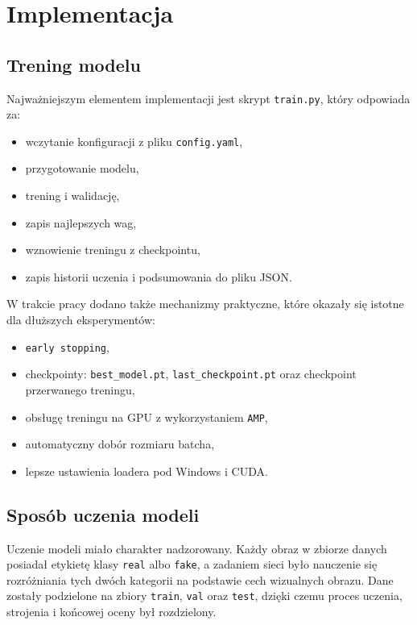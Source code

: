 \newpage
\section{Implementacja}

\subsection{Trening modelu}

Najważniejszym elementem implementacji jest skrypt \texttt{train.py}, który odpowiada za:

\begin{itemize}
    \item wczytanie konfiguracji z pliku \texttt{config.yaml},
    \item przygotowanie modelu,
    \item trening i walidację,
    \item zapis najlepszych wag,
    \item wznowienie treningu z checkpointu,
    \item zapis historii uczenia i podsumowania do pliku JSON.
\end{itemize}

W trakcie pracy dodano także mechanizmy praktyczne, które okazały się istotne dla dłuższych eksperymentów:

\begin{itemize}
    \item \texttt{early stopping},
    \item checkpointy: \texttt{best\_model.pt}, \texttt{last\_checkpoint.pt} oraz checkpoint przerwanego treningu,
    \item obsługę treningu na GPU z wykorzystaniem \texttt{AMP},
    \item automatyczny dobór rozmiaru batcha,
    \item lepsze ustawienia loadera pod Windows i CUDA.
\end{itemize}

\newpage
\subsection{Sposób uczenia modeli}

Uczenie modeli miało charakter nadzorowany. Każdy obraz w zbiorze danych posiadał etykietę klasy \texttt{real} albo \texttt{fake}, a zadaniem sieci było nauczenie się rozróżniania tych dwóch kategorii na podstawie cech wizualnych obrazu. Dane zostały podzielone na zbiory \texttt{train}, \texttt{val} oraz \texttt{test}, dzięki czemu proces uczenia, strojenia i końcowej oceny był rozdzielony.

